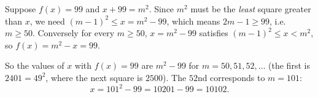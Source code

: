 Suppose $f(x)=99$ and $x+99=m^2$. Since $m^2$ must be the \emph{least} square greater than $x$, we need $(m-1)^2\le x=m^2-99$, which means $2m-1\ge99$, i.e.\ $m\ge50$. Conversely for every $m\ge50$, $x=m^2-99$ satisfies $(m-1)^2\le x<m^2$, so $f(x)=m^2-x=99$.

So the values of $x$ with $f(x)=99$ are $m^2-99$ for $m=50,51,52,\dots$ (the first is $2401=49^2$, where the next square is $2500$). The $52$nd corresponds to $m=101$:
\[
x=101^2-99=10201-99=\boxed{10102}.
\]
